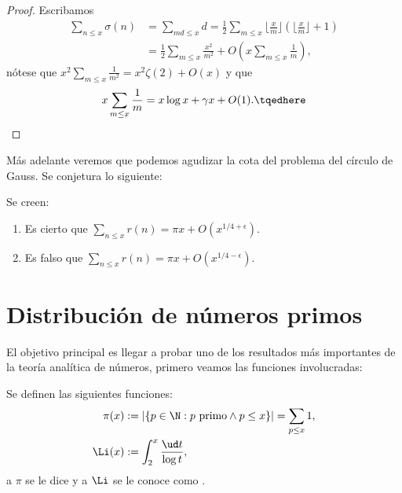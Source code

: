 \documentclass[teoria-numeros.tex]{subfiles}
\begin{document}
\begin{prop}
\end{prop}
\begin{proof}
	Escribamos
	\begin{align*}
		\sum_{n \le x} \sigma(n) &= \sum_{md \le x} d
		= \frac{1}{2} \sum_{m \le x} \lfloor \frac{x}{m} \rfloor \left( \lfloor \frac{x}{m} \rfloor + 1 \right) \\
					 &= \frac{1}{2}\sum_{m \le x} \frac{x^2}{m^2} + O\left( x \sum_{m \le x} \frac{1}{m} \right),
	\end{align*}
	nótese que $x^2 \sum_{m \le x} \frac{1}{m^2} = x^2\zeta(2) + O(x)$ y que
	\begin{equation}
		x \sum_{m \le x} \frac{1}{m} = x\log x + \gamma x + O(1).
		\tqedhere
	\end{equation}
\end{proof}

Más adelante veremos que podemos agudizar la cota del problema del círculo de Gauss.
Se conjetura lo siguiente:
\begin{con}
	Se creen:
	\begin{enumerate}
		\item Es cierto que $\displaystyle \sum_{n\le x} r(n) = \pi x + O(x^{1/4 + \epsilon})$.
		\item Es falso que $\displaystyle \sum_{n\le x} r(n) = \pi x + O(x^{1/4 - \epsilon})$.
	\end{enumerate}
\end{con}

\section{Distribución de números primos}
El objetivo principal es llegar a probar uno de los resultados más importantes de la teoría analítica de números,
primero veamos las funciones involucradas:
\begin{mydefi}
	Se definen las siguientes funciones:
	\begin{align*}
		\pi(x) &:= |\{ p\in\N : p\text{ primo} \wedge p\le x \}| = \sum_{p \le x} 1, \\
		\Li(x) &:= \int_2^x \frac{\ud t}{\log t},
	\end{align*}
	a $\pi$ se le dice  y a $\Li$ se le conoce como .
\end{mydefi}
\end{document}

